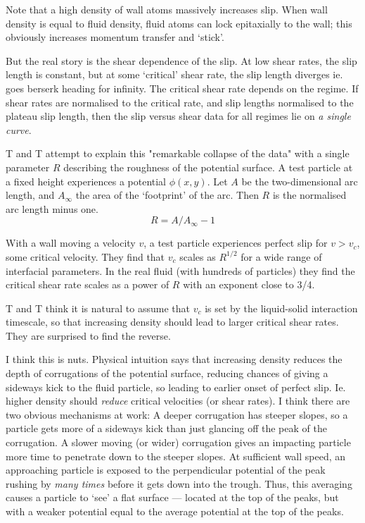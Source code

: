 \documentclass[twocolumn]{article}
\begin{document}
\vspace*{1em}
Note that a high density of wall atoms massively increases slip. When wall density is equal to fluid density, fluid atoms can lock epitaxially to the wall; this obviously increases momentum transfer and `stick'.

But the real story is the shear dependence of the slip.  At low shear rates, the slip length is constant, but at some `critical' shear rate, the slip length diverges ie. goes berserk heading for infinity.  The critical shear rate depends on the regime. If shear rates are normalised to the critical rate, and slip lengths normalised to the plateau slip length, then the slip versus shear data for all regimes lie on \emph{a single curve}.

T and T attempt to explain this "remarkable collapse of the data" with a single parameter $R$ describing the roughness of the potential surface. A test particle at a fixed height experiences a potential $\phi(x,y)$. Let $A$ be the two-dimensional arc length, and $A_{\infty}$ the area of the `footprint' of the arc. Then $R$ is the normalised arc length minus one.
\[ R = A/A_{\infty} -1\]

With a wall moving a velocity $v$, a test particle experiences perfect slip for $v > v_{c}$, some critical velocity. They find that $v_{c}$ scales as $R^{1/2}$ for a wide range of interfacial parameters.  In the real fluid (with hundreds of particles) they find the critical shear rate scales as a power of $R$ with an exponent close to 3/4.

T and T think it is natural to assume that $v_{c}$ is set by the liquid-solid interaction timescale, so that increasing density should lead to larger critical shear rates.  They are surprised to find the reverse.

I think this is nuts. Physical intuition says that increasing density reduces the depth of corrugations of the potential surface, reducing chances of giving a sideways kick to the fluid particle, so leading to earlier onset of perfect slip. Ie. higher density should \emph{reduce} critical velocities (or shear rates).  I think there are two obvious mechanisms at work:  A deeper corrugation has steeper slopes, so a particle gets more of a sideways kick than just glancing off the peak of the corrugation. A slower moving (or wider) corrugation gives an impacting particle more time to penetrate down to the steeper slopes. At sufficient wall speed, an approaching particle is exposed to the perpendicular potential of the peak rushing by \emph{many times} before it gets down into the trough. Thus, this averaging causes a particle to `see' a flat surface --- located at the top of the peaks, but with a weaker potential equal to the average potential at the top of the peaks.
\end{document}
